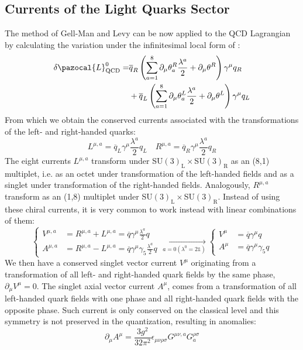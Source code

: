 \documentclass[../main.tex]{subfiles}
\begin{document}
\subsection{Currents of the Light Quarks Sector}
The method of Gell-Man and Levy can be now applied to the QCD Lagrangian by calculating the variation under the infinitesimal local form of :
\begin{align*}    
\delta\pazocal{L}_{\text{QCD}}^0=&\overline{q}_R\left(\sum_{a=1}^8\partial_\mu\theta_a^R\frac{\lambda^a}{2}+\partial_\mu\theta^R\right)\gamma^\mu q_R\\
&+\overline{q}_L\left(\sum_{a=1}^8\partial_\mu\theta_a^L\frac{\lambda^a}{2}+\partial_\mu\theta^L\right)\gamma^\mu q_L
\end{align*}
From which we obtain the conserved currents associated with the transformations of the left- and right-handed quarks:
\[
L^{\mu,a}=\overline{q}_L\gamma^\mu\frac{\lambda^a}{2}q_L \quad R^{\mu,a}=\overline{q}_R\gamma^\mu\frac{\lambda^a}{2}q_R
\]
The eight currents $L^{\mu,a}$ transform under SU$(3)_{\text{L}}\times$SU$(3)_{\text{R}}$ as an (8,1) multiplet, i.e. as an octet under transformation of the left-handed fields and as a singlet under transformation of the right-handed fields. Analogously, $R^{\mu,a}$ transform as an (1,8) multiplet under SU$(3)_{\text{L}}\times$SU$(3)_{\text{R}}$. Instead of using these chiral currents, it is very common to work instead with linear combinations of them:
\[
\left\{
\begin{aligned}
V^{\mu,a}&=R^{\mu,a}+L^{\mu,a}=\overline{q}\gamma^\mu\frac{\lambda^a}{2}q\\
A^{\mu,a}&=R^{\mu,a}-L^{\mu,a}=\overline{q}\gamma^\mu\gamma_5\frac{\lambda^a}{2}q
\end{aligned}
\right.
\xrightarrow[a=0 (\lambda^0=2\mathbb{1})]{}
\left\{
\begin{aligned}
V^\mu&=\overline{q}\gamma^\mu q\\
A^\mu&=\overline{q}\gamma^\mu\gamma_5q
\end{aligned}
\right.
\]
We then have a conserved singlet vector current $V^\mu$ originating from a transformation of all left- and right-handed quark fields by the same phase, $\partial_\mu V^\mu=0$. The singlet axial vector current $A^\mu$, comes from a transformation of all left-handed quark fields with one phase and all right-handed quark fields with the opposite phase. Such current is only conserved on the classical level and this symmetry is not preserved in the quantization, resulting in anomalies:
\[
\partial_\mu A^\mu=\frac{3g^2}{32\pi^2}\epsilon_{\mu\nu\rho\sigma}G^{\mu\nu,a}G^{\rho\sigma}_a
\]
\end{document}
